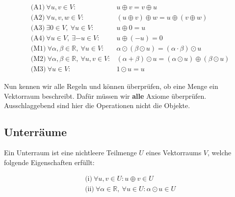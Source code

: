 \begin{tcolorbox}[colback=gray!30, colframe=gray!80, title=Axiome für Vektorräume]
    \begin{equation*}
        \begin{aligned}
            &\text{(A1)} \ \forall u, v \in V: &u \oplus v = v \oplus u \\
            &\text{(A2)} \ \forall u, v, w \in V: &(u \oplus v) \oplus w = u \oplus (v \oplus w) \\
            &\text{(A3)} \ \exists 0 \in V, \ \forall u \in V: & u \oplus 0 = u \\
            &\text{(A4)} \ \forall u \in V, \ \exists -u \in V: & u \oplus (-u) = 0 \\
            &\text{(M1)} \ \forall \alpha, \beta \in \mathbb{R}, \ \forall u \in V: & \alpha \odot (\beta \odot u) = (\alpha \cdot \beta) \odot u \\
            &\text{(M2)} \ \forall \alpha, \beta \in \mathbb{R}, \ \forall u, v \in V: & (\alpha + \beta) \odot u = (\alpha \odot u) \oplus (\beta \odot u) \\
            &\text{(M3)} \ \forall u \in V: & 1 \odot u = u
        \end{aligned}
    \end{equation*}
\end{tcolorbox}

\vspace{1\baselineskip}

Nun kennen wir alle Regeln und können überprüfen, ob eine Menge ein Vektorraum beschreibt. Dafür müssen wir \textbf{alle} Axiome überprüfen. Ausschlaggebend sind hier die Operationen nicht die Objekte.

\subsection{Unterräume}

Ein Unterraum ist eine nichtleere Teilmenge \( U \) eines Vektorraums \( V \), welche folgende Eigenschaften erfüllt:

\begin{equation*}
    \begin{aligned}
        &\text{(i)} \ \forall u, v \in U: u \oplus v \in U \\
        &\text{(ii)} \ \forall \alpha \in \mathbb{R}, \ \forall u \in U: \alpha \odot u \in U
    \end{aligned}
\end{equation*}


